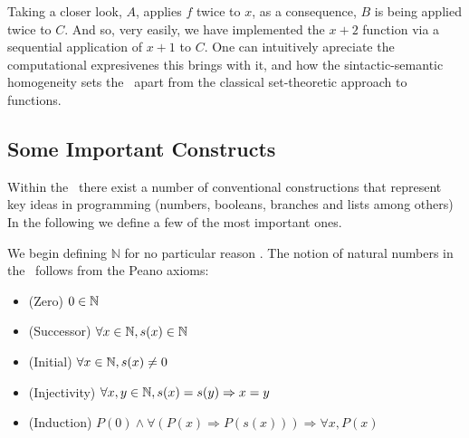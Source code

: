 \documentclass[12pt]{book}
\begin{document}
Taking a closer look, $A$, applies $f$ twice to $x$, as a consequence, $B$ is being applied twice to $C$. And so, very easily, we have implemented the $ x + 2 $ function via a sequential application of $x + 1$ to $C$. One can intuitively apreciate the computational expresivenes this brings with it, and how the sintactic-semantic homogeneity sets the \lcalc \ apart from the classical set-theoretic approach to functions.


\subsection{\centering Some Important Constructs}

Within the \lcalc \ there exist a number of conventional constructions that represent key ideas in programming (numbers, booleans, branches and lists among others) In the following we define a few of the most important ones.

We begin defining $ \mathbb{N} $ for no particular reason . The notion of natural numbers in the \lcalc \ follows from the Peano axioms:
\begin{itemize}
\item (Zero) \( 0 \in \mathbb{N} \)
\item (Successor) \( \forall x \in \mathbb{N}, s(x) \in \mathbb{N} \)
\item (Initial) \( \forall x \in \mathbb{N}, s(x) \neq 0 \) \label{def:peano-nat-initial}
\item (Injectivity) \( \forall x, y \in \mathbb{N}, s(x) = s(y) \Rightarrow x = y \)
\item (Induction) \( P(0) \land \forall ( P(x) \Rightarrow P(s(x))) \Rightarrow \forall x,  P (x) \)
\end{itemize}
\end{document}
